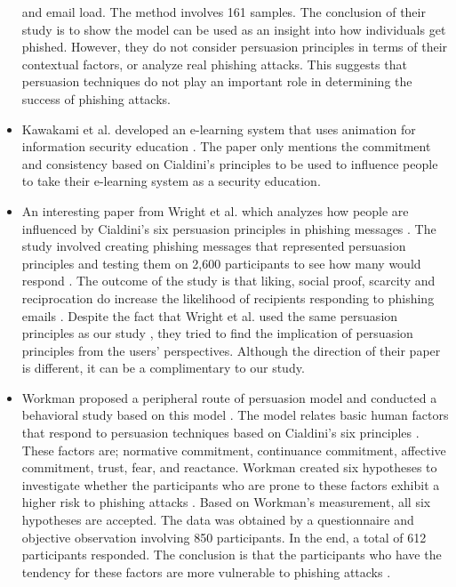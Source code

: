 \begin{itemize}
and email load. The method involves 161 samples. The conclusion of
their study is to show the model can be used as an insight into how
individuals get phished. However, they do not consider persuasion
principles in terms of their contextual factors, or analyze real phishing
attacks. This suggests that persuasion techniques do not play an important
role in determining the success of phishing attacks.
\item Kawakami et al. developed an e-learning system that uses animation
for information security education \citep{kawakami2010development}.
The paper only mentions the commitment and consistency based on Cialdini's
principles to be used to influence people to take their e-learning
system as a security education.
\item An interesting paper from Wright et al. which analyzes how people
are influenced by Cialdini's six persuasion principles in phishing
messages \citep{wright2014research}\citep{cialdini:2001}. The study
involved creating phishing messages that represented persuasion principles
and testing them on 2,600 participants to see how many would respond
\citep{wright2014research}. The outcome of the study is that liking,
social proof, scarcity and reciprocation do increase the likelihood
of recipients responding to phishing emails \citep{wright2014research}.
Despite the fact that Wright et al. used the same persuasion principles
as our study \citep{cialdini:2001}, they tried to find the implication
of persuasion principles from the users' perspectives. Although the
direction of their paper is different, it can be a complimentary to
our study.
\item Workman proposed a peripheral route of persuasion model and conducted
a behavioral study based on this model \citep{workman:2008}. The
model relates basic human factors that respond to persuasion techniques
based on Cialdini\textquoteright s six principles \citep{cialdini:2001}.
These factors are; normative commitment, continuance commitment, affective
commitment, trust, fear, and reactance. Workman created six hypotheses
to investigate whether the participants who are prone to these factors
exhibit a higher risk to phishing attacks \citep{workman:2008}. Based
on Workman's measurement, all six hypotheses are accepted. The data
was obtained by a questionnaire and objective observation involving
850 participants. In the end, a total of 612 participants responded.
The conclusion is that the participants who have the tendency for
these factors are more vulnerable to phishing attacks \citep{workman:2008}.

\end{itemize}
